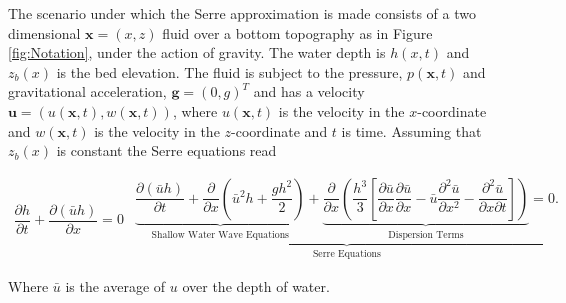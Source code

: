 \documentclass[SingleSpace,12pt]{Serre_ASCE}
\begin{document}
The scenario under which the Serre approximation is made consists of a two dimensional $\textbf{x} = (x,z)$ fluid over a bottom topography as in Figure \ref{fig:Notation}, under the action of gravity. The water depth is $h(x,t)$ and $z_b(x)$ is the bed elevation. The fluid is subject to the pressure, $p(\textbf{x},t)$ and  gravitational acceleration, $\textbf{g} = (0,g)^T$ and has a velocity $\textbf{u} = (u(\textbf{x},t),w(\textbf{x},t))$,  where $u(\textbf{x},t)$ is the velocity in the $x$-coordinate and $w(\textbf{x},t)$ is the velocity in the $z$-coordinate and $t$ is time. Assuming that $z_b(x)$ is constant the Serre equations read \cite{Guyenne-etal-2014-169,Zoppou-2014}
\begin{linenomath*}
\begin{subequations}\label{eq:Serre_conservative_form}
\begin{gather}
\dfrac{\partial h}{\partial t} + \dfrac{\partial (\bar{u}h)}{\partial x} = 0
\label{eq:Serre_continuity}
\end{gather}
\begin{gather}
\underbrace{\underbrace{\dfrac{\partial (\bar{u}h)}{\partial t} + \dfrac{\partial}{\partial x} \left ( \bar{u}^2h + \dfrac{gh^2}{2}\right )}_{\text{Shallow Water Wave Equations}} + \underbrace{\dfrac{\partial}{\partial x} \left (  \dfrac{h^3}{3} \left [ \dfrac{\partial \bar{u} }{\partial x} \dfrac{\partial \bar{u}}{\partial x} - \bar{u} \dfrac{\partial^2 \bar{u}}{\partial x^2}  - \dfrac{\partial^2 \bar{u}}{\partial x \partial t}\right ] \right )}_{\text{Dispersion Terms}} = 0.}_{\text{Serre Equations}}
\label{eq:Serre_momentum}
\end{gather}
\end{subequations}
\end{linenomath*}
Where $\bar{u}$ is the average of $u$ over the depth of water.
\end{document}
